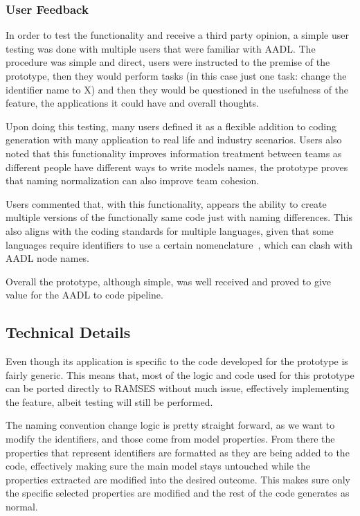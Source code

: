 \subsubsection{User Feedback}

In order to test the functionality and receive a third party opinion, a simple user testing was done with multiple users that were familiar with AADL. The procedure was simple and direct, users were instructed to the premise of the prototype, then they would perform tasks (in this case just one task: change the identifier name to X) and then they would be questioned in the usefulness of the feature, the applications it could have and overall thoughts.

Upon doing this testing, many users defined it as a flexible addition to coding generation with many application to real life and industry scenarios. Users also noted that this functionality improves information treatment between teams as different people have different ways to write models names, the prototype proves that naming normalization can also improve team cohesion.

Users commented that, with this functionality, appears the ability to create multiple versions of the functionally same code just with naming differences. This also aligns with the coding standards for multiple languages, given that some languages require identifiers to use a certain nomenclature~\cite{Google_cpp_style_guide, Python_coding_style}, which can clash with AADL node names.

Overall the prototype, although simple, was well received and proved to give value for the AADL to code pipeline.

\subsection{Technical Details}
\label{sec:prototype_technical_details}

Even though its application is specific to the code developed for the prototype is fairly generic. This means that, most of the logic and code used for this prototype can be ported directly to RAMSES without much issue, effectively implementing the feature, albeit testing will still be performed.

The naming convention change logic is pretty straight forward, as we want to modify the identifiers, and those come from model properties. From there the properties that represent identifiers are formatted as they are being added to the code, effectively making sure the main model stays untouched while the properties extracted are modified into the desired outcome. This makes sure only the specific selected properties are modified and the rest of the code generates as normal.

